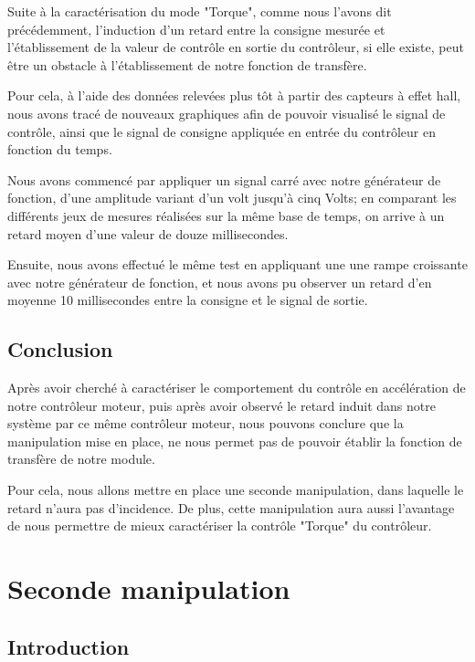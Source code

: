 \documentclass[french,a4paper,12pt]{report}
\begin{document}
		Suite à la caractérisation du mode "Torque", comme nous l'avons dit précédemment, l'induction d'un retard entre la consigne mesurée et l'établissement de la valeur de contrôle en sortie du contrôleur, si elle existe, peut être un obstacle à l'établissement de notre fonction de transfère.
		
		Pour cela, à l'aide des données relevées plus tôt à partir des capteurs à effet hall, nous avons tracé de nouveaux graphiques afin de pouvoir visualisé le signal de contrôle, ainsi que le signal de consigne appliquée en entrée du contrôleur en fonction du temps.
		
		Nous avons commencé par appliquer un signal carré avec notre générateur de fonction, d'une amplitude variant d'un volt jusqu'à cinq Volts; en comparant les différents jeux de mesures réalisées sur la même base de temps, on arrive à un retard moyen d'une valeur de douze millisecondes.
		
		Ensuite, nous avons effectué le même test en appliquant une une rampe croissante avec notre générateur de fonction, et nous avons pu observer un retard d'en moyenne 10 millisecondes entre la consigne et le signal de sortie.
		
		\section{Conclusion}
		Après avoir cherché à caractériser le comportement du contrôle en accélération de notre contrôleur moteur, puis après avoir observé le retard induit dans notre système par ce même contrôleur moteur, nous pouvons conclure que la manipulation mise en place, ne nous permet pas de pouvoir établir la fonction de transfère de notre module.
		
		Pour cela, nous allons mettre en place une seconde manipulation, dans laquelle le retard n'aura pas d'incidence. De plus, cette manipulation aura aussi l'avantage de nous permettre de mieux caractériser la contrôle "Torque" du contrôleur.
		
		\newpage		
		
	\chapter{Seconde manipulation}
	
		\section{Introduction}
	
\end{document}
